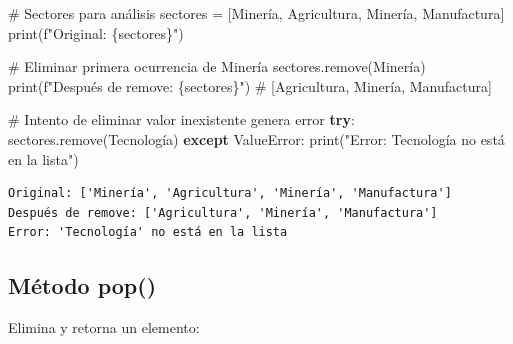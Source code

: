 \documentclass[
  doc,
  floatsintext,
  longtable,
  a4paper,
  nolmodern,
  notxfonts,
  notimes,
  12pt,
  colorlinks=true,linkcolor=blue,citecolor=blue,urlcolor=blue]{apa7}
\newenvironment{Shaded}{\begin{snugshade}}{\end{snugshade}}
\newcommand{\BuiltInTok}[1]{\textcolor[rgb]{0.00,0.23,0.31}{#1}}
\newcommand{\CommentTok}[1]{\textcolor[rgb]{0.37,0.37,0.37}{#1}}
\newcommand{\ControlFlowTok}[1]{\textcolor[rgb]{0.00,0.23,0.31}{\textbf{#1}}}
\newcommand{\NormalTok}[1]{\textcolor[rgb]{0.00,0.23,0.31}{#1}}
\newcommand{\OperatorTok}[1]{\textcolor[rgb]{0.37,0.37,0.37}{#1}}
\newcommand{\PreprocessorTok}[1]{\textcolor[rgb]{0.68,0.00,0.00}{#1}}
\newcommand{\SpecialCharTok}[1]{\textcolor[rgb]{0.37,0.37,0.37}{#1}}
\newcommand{\SpecialStringTok}[1]{\textcolor[rgb]{0.13,0.47,0.30}{#1}}
\newcommand{\StringTok}[1]{\textcolor[rgb]{0.13,0.47,0.30}{#1}}
\begin{document}
\begin{Shaded}
\begin{Highlighting}[]
\CommentTok{\# Sectores para análisis}
\NormalTok{sectores }\OperatorTok{=}\NormalTok{ [}\StringTok{\textquotesingle{}Minería\textquotesingle{}}\NormalTok{, }\StringTok{\textquotesingle{}Agricultura\textquotesingle{}}\NormalTok{, }\StringTok{\textquotesingle{}Minería\textquotesingle{}}\NormalTok{, }\StringTok{\textquotesingle{}Manufactura\textquotesingle{}}\NormalTok{]}
\BuiltInTok{print}\NormalTok{(}\SpecialStringTok{f"Original: }\SpecialCharTok{\{}\NormalTok{sectores}\SpecialCharTok{\}}\SpecialStringTok{"}\NormalTok{)}

\CommentTok{\# Eliminar primera ocurrencia de \textquotesingle{}Minería\textquotesingle{}}
\NormalTok{sectores.remove(}\StringTok{\textquotesingle{}Minería\textquotesingle{}}\NormalTok{)}
\BuiltInTok{print}\NormalTok{(}\SpecialStringTok{f"Después de remove: }\SpecialCharTok{\{}\NormalTok{sectores}\SpecialCharTok{\}}\SpecialStringTok{"}\NormalTok{)}
\CommentTok{\# [\textquotesingle{}Agricultura\textquotesingle{}, \textquotesingle{}Minería\textquotesingle{}, \textquotesingle{}Manufactura\textquotesingle{}]}

\CommentTok{\# Intento de eliminar valor inexistente genera error}
\ControlFlowTok{try}\NormalTok{:}
\NormalTok{    sectores.remove(}\StringTok{\textquotesingle{}Tecnología\textquotesingle{}}\NormalTok{)}
\ControlFlowTok{except} \PreprocessorTok{ValueError}\NormalTok{:}
    \BuiltInTok{print}\NormalTok{(}\StringTok{"Error: \textquotesingle{}Tecnología\textquotesingle{} no está en la lista"}\NormalTok{)}
\end{Highlighting}
\end{Shaded}

\begin{verbatim}
Original: ['Minería', 'Agricultura', 'Minería', 'Manufactura']
Después de remove: ['Agricultura', 'Minería', 'Manufactura']
Error: 'Tecnología' no está en la lista
\end{verbatim}

\subsection{Método pop()}\label{muxe9todo-pop}

Elimina y retorna un elemento:
\end{document}
